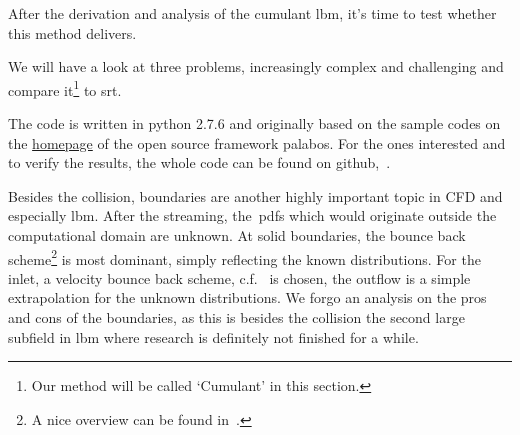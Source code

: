 After the derivation and analysis of the cumulant \gls{lbm}, it's time to test whether this method delivers.

We will have a look at three problems, increasingly complex and challenging and compare it\footnote{Our method will be called `Cumulant' in this section.} to \gls{srt}.

The code is written in python 2.7.6 and originally based on the sample codes on the \href{http://wiki.palabos.org/numerics:codes}{homepage} of the open source framework palabos.
For the ones interested and to verify the results, the whole code can be found on github,~\cite{gitrepo_MastersThesis}.

Besides the collision, boundaries are another highly important topic in CFD and especially \gls{lbm}.
After the streaming, the~\glspl{pdf} which would originate outside the computational domain are unknown.
At solid boundaries, the bounce back scheme\footnote{A nice overview can be found in~\cite{boundaries}.} is most dominant, simply reflecting the known distributions.
For the inlet, a velocity bounce back scheme, c.f.~\cite{yu2003viscous} is chosen, the outflow is a simple extrapolation for the unknown distributions.
We forgo an analysis on the pros and cons of the boundaries, as this is besides the collision the second large subfield in \gls{lbm} where research is definitely not finished for a while.
